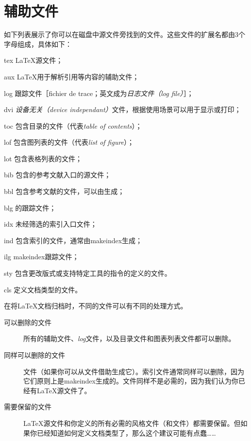 \section{辅助文件}

如下列表展示了你可以在磁盘中源文件旁找到的文件。这些文件的扩展名都由3个字母组成，具体如下：

\begin{ficaux}
    \item[tex]\LaTeX 源文件；
    \item[aux]\LaTeX 用于解析引用等内容的辅助文件；
    \item[log]跟踪文件［fichier de trace；英文成为\emph{日志文件（log file）}］；
    \item[dvi]\emph{设备无关（device independant）}文件，根据使用场景可以用于显示或打印；
    \item[toc]包含目录的文件（代表\emph{table of contents}）；
    \item[lof]包含图列表的文件（代表\emph{list of figure}）；
    \item[lot]包含表格列表的文件；
    \item[bib]包含的参考文献入口的\bib 源文件；
    \item[bbl]包含参考文献的文件，可以由\bib 生成；
    \item[blg]\bib 的跟踪文件；
    \item[idx]未经筛选的索引入口文件；
    \item[ind]包含索引的文件，通常由\textsf{makeindex}生成；
    \item[ilg]\textsf{makeindex}跟踪文件；
    \item[sty]包含更改版式或支持特定工具的指令的定义的文件。
    \item[cls]定义文档类型的文件。 
\end{ficaux}

在将\LaTeX 文档归档时，不同的文件可以有不同的处理方式。

\begin{description}
    \item[可以删除的文件]所有的辅助文件、\emph{log}文件，以及目录文件和图表列表文件都可以删除。
    \item[同样可以删除的文件]文件（如果你可以从文件借助\bib 生成它）。索引文件通常同样可以删除，因为它们原则上是\textsf{makeindex}生成的。文件同样不是必需的，因为我们认为你已经有\LaTeX 源文件了。
    \item[需要保留的文件]\LaTeX 源文件和你定义的所有必需的风格文件（和文件）都需要保留。但如果你已经知道如何定义文档类型了，那么这个建议可能有点蠢……
\end{description}

